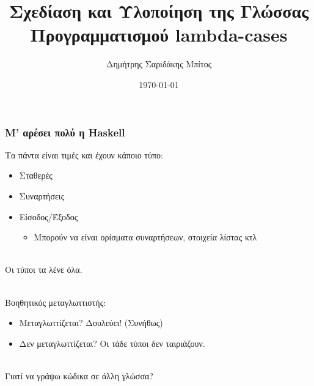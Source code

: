 \documentclass{beamer}
\date{\today}
\author{Δημήτρης Σαριδάκης Μπίτος}
\institute{
Σχολή Ηλεκτρολόγων Μηχανικών και Μηχανικών Υπολογιστών
\\
Εθνικό Μετσόβιο Πολυτεχνείο
}
\def\e{\foreignlanguage{english}}
\def\h{\e{Haskell}}
\begin{document}
\title{Σχεδίαση και Υλοποίηση της Γλώσσας Προγραμματισμού \e{lambda-cases}}
\frame{\titlepage}

\begin{frame}

\frametitle{Μ' αρέσει πολύ η \h}

Τα πάντα είναι τιμές και έχουν κάποιο τύπο:

\begin{itemize}

\item Σταθερές
\item Συναρτήσεις
\item Είσοδος/Έξοδος

\begin{itemize}

\item Μπορούν να είναι ορίσματα συναρτήσεων, στοιχεία λίστας κτλ
\\~\
\end{itemize}

\end{itemize}

Οι τύποι τα λένε όλα.
\\~\

Βοηθητικός μεταγλωττιστής:

\begin{itemize}

\item Μεταγλωττίζεται? Δουλεύει! (Συνήθως)

\item Δεν μεταγλωττίζεται? Οι τάδε τύποι δεν ταιριάζουν.
\\~\

\end{itemize}

Γιατί να γράψω κώδικα σε άλλη γλώσσα?

\end{frame}
\end{document}
